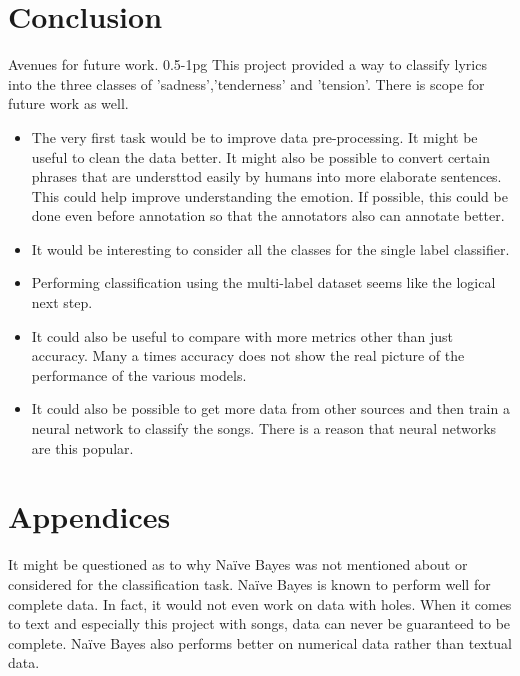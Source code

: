 \documentclass[11pt,a4paper]{article}
\begin{document}
\section{Conclusion}
\label{conclusion}
Avenues for future work. 0.5-1pg
This project provided a way to classify lyrics into the three classes of 'sadness','tenderness' and 'tension'. There is scope for future work as well.
\begin{itemize}
  \item The very first task would be to improve data pre-processing. It might be useful to clean the data better. It might also be possible to convert certain phrases that are understtod easily by humans into more elaborate sentences. This could help improve understanding the emotion. If possible, this could be done even before annotation so that the annotators also can annotate better.
  \item It would be interesting to consider all the classes for the single label classifier. 
  \item Performing classification using the multi-label dataset seems like the logical next step. 
  \item It could also be useful to compare with more metrics other than just accuracy. Many a times accuracy does not show the real picture of the performance of the various models. 
  \item It could also be possible to get more data from other sources and then train a neural network to classify the songs. There is a reason that neural networks are this popular.
\end{itemize}




\appendix

\section{Appendices}
\label{sec:appendix}

It might be questioned as to why Naïve Bayes was not mentioned about or considered for the classification task. Naïve Bayes is known to perform well for complete data. In fact, it would not even work on data with holes. When it comes to text and especially this project with songs, data can never be guaranteed to be complete. Naïve Bayes also performs better on numerical data rather than textual data.\\
\end{document}
